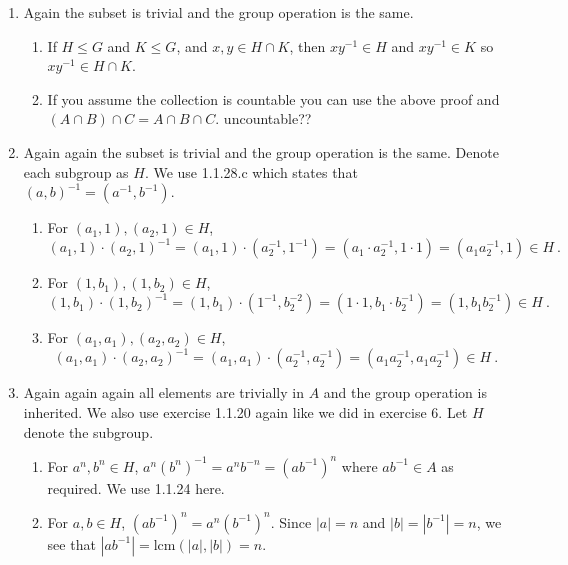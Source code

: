 \documentclass[]{article}
\newcommand{\abs}[1]{\left\vert #1 \right\vert}
\begin{document}
\begin{enumerate}
\item Again the subset is trivial and the group operation is the same.
\begin{enumerate}
\item If $H\leq G$ and $K\leq G$, and $x,y \in H\cap K$, then $xy^{-1}\in H$ and $xy^{-1}\in K$ so $xy^{-1} \in H\cap K$.
\item If you assume the collection is countable you can use the above proof and $(A\cap B)\cap C = A\cap B\cap C$. {\color{red} uncountable??}
\end{enumerate}


\item Again again the subset is trivial and the group operation is the same. Denote each subgroup as $H$. We use 1.1.28.c which states that $(a,b)^{-1} = (a^{-1},b^{-1})$.
\begin{enumerate}
\item For $(a_1,1), (a_2,1) \in H$, 
\begin{equation}
(a_1,1)\cdot (a_2,1)^{-1} = (a_1,1)\cdot (a_2^{-1},1^{-1}) = (a_1\cdot a_2^{-1},1\cdot 1) = (a_1a_2^{-1},1) \in H\ .
\end{equation}
\item For $(1,b_1), (1,b_2) \in H$, 
\begin{equation}
(1,b_1)\cdot (1,b_2)^{-1} = (1,b_1)\cdot (1^{-1},b_2^{-2}) = (1\cdot 1,b_1\cdot b_2^{-1}) = (1,b_1b_2^{-1}) \in H\ .
\end{equation}
\item For $(a_1,a_1), (a_2,a_2) \in H$,
\begin{equation}
(a_1,a_1)\cdot (a_2,a_2)^{-1} = (a_1,a_1)\cdot (a_2^{-1},a_2^{-1}) = (a_1a_2^{-1},a_1a_2^{-1}) \in H\ .
\end{equation}
\end{enumerate}


\item Again again again all elements are trivially in $A$ and the group operation is inherited. We also use exercise 1.1.20 again like we did in exercise 6. Let $H$ denote the subgroup.
\begin{enumerate}
\item For $a^n,b^n \in H$, $a^n(b^n)^{-1} = a^nb^{-n} = (ab^{-1})^n$ where $ab^{-1}\in A$ as required. We use 1.1.24 here. 
\item For $a,b \in H$, $(ab^{-1})^n = a^n(b^{-1})^n$. Since $\abs{a} = n$ and $\abs{b} = \abs{b^{-1}} = n$, we see that $\abs{ab^{-1}} = \text{lcm}(\abs{a},\abs{b}) = n$.
\end{enumerate}



\end{enumerate}
\end{document}
